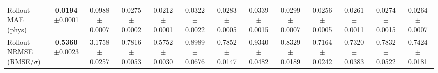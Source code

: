 \begin{table}[t]
{\begin{tabular}{lcccccccccccc}
Rollout MAE (phys) & \makecell{\textbf{0.0194}\\[-2pt]{\scriptsize$\pm$0.0001}} & \makecell{0.0988\\[-2pt]{\scriptsize$\pm$0.0007}} & \makecell{0.0275\\[-2pt]{\scriptsize$\pm$0.0002}} & \makecell{0.0212\\[-2pt]{\scriptsize$\pm$0.0001}} & \makecell{0.0322\\[-2pt]{\scriptsize$\pm$0.0022}} & \makecell{0.0283\\[-2pt]{\scriptsize$\pm$0.0005}} & \makecell{0.0339\\[-2pt]{\scriptsize$\pm$0.0015}} & \makecell{0.0299\\[-2pt]{\scriptsize$\pm$0.0007}} & \makecell{0.0256\\[-2pt]{\scriptsize$\pm$0.0005}} & \makecell{0.0261\\[-2pt]{\scriptsize$\pm$0.0011}} & \makecell{0.0274\\[-2pt]{\scriptsize$\pm$0.0015}} & \makecell{0.0264\\[-2pt]{\scriptsize$\pm$0.0007}} \\
Rollout NRMSE (RMSE/$\sigma$) & \makecell{\textbf{0.5360}\\[-2pt]{\scriptsize$\pm$0.0023}} & \makecell{3.1758\\[-2pt]{\scriptsize$\pm$0.0257}} & \makecell{0.7816\\[-2pt]{\scriptsize$\pm$0.0053}} & \makecell{0.5752\\[-2pt]{\scriptsize$\pm$0.0030}} & \makecell{0.8989\\[-2pt]{\scriptsize$\pm$0.0676}} & \makecell{0.7852\\[-2pt]{\scriptsize$\pm$0.0147}} & \makecell{0.9340\\[-2pt]{\scriptsize$\pm$0.0482}} & \makecell{0.8329\\[-2pt]{\scriptsize$\pm$0.0189}} & \makecell{0.7164\\[-2pt]{\scriptsize$\pm$0.0242}} & \makecell{0.7320\\[-2pt]{\scriptsize$\pm$0.0383}} & \makecell{0.7832\\[-2pt]{\scriptsize$\pm$0.0522}} & \makecell{0.7424\\[-2pt]{\scriptsize$\pm$0.0181}} \\

\end{tabular}}
\end{table}
